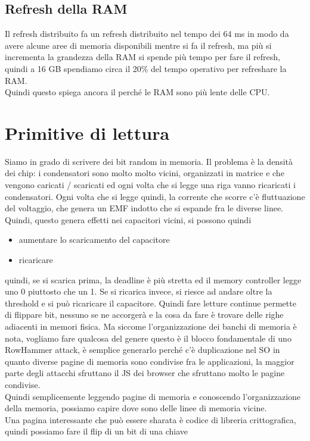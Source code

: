 \documentclass[12pt, oneside]{extbook} %
\begin{document}
\subsection{Refresh della RAM}
Il refresh distribuito fa un refresh distribuito nel tempo dei 64 ms in modo da avere alcune aree di memoria disponibili mentre si fa il refresh, ma più si incrementa la grandezza della RAM si spende più tempo per fare il refresh, quindi a 16 GB spendiamo circa il 20\% del tempo operativo per refreshare la RAM.\\Quindi questo spiega ancora il perché le RAM sono più lente delle CPU.
\section{Primitive di lettura}
Siamo in grado di scrivere dei bit random in memoria. Il problema è la densità dei chip: i condensatori sono molto molto vicini, organizzati in matrice e che vengono caricati / scaricati ed ogni volta che si legge una riga vanno ricaricati i condensatori. Ogni volta che si legge quindi, la corrente che scorre c'è fluttuazione del voltaggio, che genera un EMF indotto che si espande fra le diverse linee. Quindi, questo genera effetti nei capacitori vicini, si possono quindi
\begin{itemize}
\item aumentare lo scaricamento del capacitore
\item ricaricare
\end{itemize}
quindi, se si scarica prima, la deadline è più stretta ed il memory controller legge uno 0 piuttosto che un 1. Se si ricarica invece, si riesce ad andare oltre la threshold e si può ricaricare il capacitore. Quindi fare letture continue permette di flippare bit, nessuno se ne accorgerà e la cosa da fare è trovare delle righe adiacenti in memori fisica. Ma siccome l'organizzazione dei banchi di memoria è nota, vogliamo fare qualcosa del genere
questo è il blocco fondamentale di uno RowHammer attack, è semplice generarlo perché c'è duplicazione nel SO in quanto diverse pagine di memoria sono condivise fra le applicazioni, la maggior parte degli attacchi sfruttano il JS dei browser che sfruttano molto le pagine condivise.\\Quindi semplicemente leggendo pagine di memoria e conoscendo l'organizzazione della memoria, possiamo capire dove sono delle linee di memoria vicine.\\ Una pagina interessante che può essere sharata è codice di libreria crittografica, quindi possiamo fare il flip di un bit di una chiave
\end{document}
